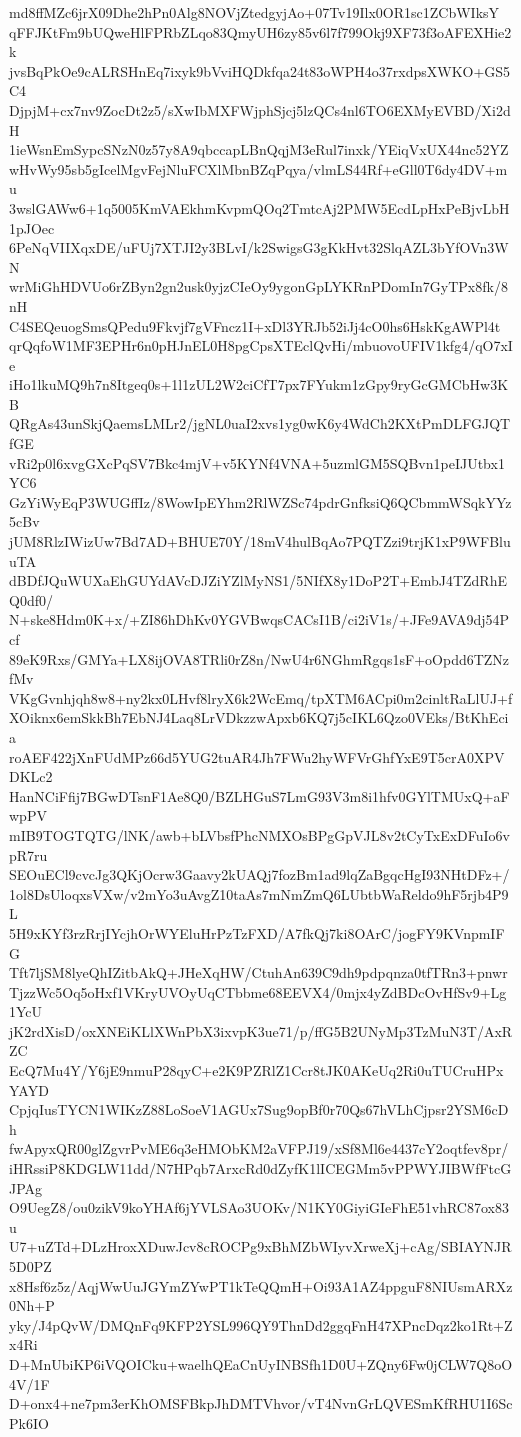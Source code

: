 md8ffMZc6jrX09Dhe2hPn0Alg8NOVjZtedgyjAo+07Tv19Ilx0OR1sc1ZCbWIksY
qFFJKtFm9bUQweHlFPRbZLqo83QmyUH6zy85v6l7f799Okj9XF73f3oAFEXHie2k
jvsBqPkOe9cALRSHnEq7ixyk9bVviHQDkfqa24t83oWPH4o37rxdpsXWKO+GS5C4
DjpjM+cx7nv9ZocDt2z5/sXwIbMXFWjphSjcj5lzQCs4nl6TO6EXMyEVBD/Xi2dH
1ieWsnEmSypcSNzN0z57y8A9qbccapLBnQqjM3eRul7inxk/YEiqVxUX44nc52YZ
wHvWy95sb5gIcelMgvFejNluFCXlMbnBZqPqya/vlmLS44Rf+eGll0T6dy4DV+mu
3wslGAWw6+1q5005KmVAEkhmKvpmQOq2TmtcAj2PMW5EcdLpHxPeBjvLbH1pJOec
6PeNqVIIXqxDE/uFUj7XTJI2y3BLvI/k2SwigsG3gKkHvt32SlqAZL3bYfOVn3WN
wrMiGhHDVUo6rZByn2gn2usk0yjzCIeOy9ygonGpLYKRnPDomIn7GyTPx8fk/8nH
C4SEQeuogSmsQPedu9Fkvjf7gVFncz1I+xDl3YRJb52iJj4cO0hs6HskKgAWPl4t
qrQqfoW1MF3EPHr6n0pHJnEL0H8pgCpsXTEclQvHi/mbuovoUFIV1kfg4/qO7xIe
iHo1lkuMQ9h7n8Itgeq0s+1l1zUL2W2ciCfT7px7FYukm1zGpy9ryGcGMCbHw3KB
QRgAs43unSkjQaemsLMLr2/jgNL0uaI2xvs1yg0wK6y4WdCh2KXtPmDLFGJQTfGE
vRi2p0l6xvgGXcPqSV7Bkc4mjV+v5KYNf4VNA+5uzmlGM5SQBvn1peIJUtbx1YC6
GzYiWyEqP3WUGffIz/8WowIpEYhm2RlWZSc74pdrGnfksiQ6QCbmmWSqkYYz5cBv
jUM8RlzIWizUw7Bd7AD+BHUE70Y/18mV4hulBqAo7PQTZzi9trjK1xP9WFBluuTA
dBDfJQuWUXaEhGUYdAVcDJZiYZlMyNS1/5NIfX8y1DoP2T+EmbJ4TZdRhEQ0df0/
N+ske8Hdm0K+x/+ZI86hDhKv0YGVBwqsCACsI1B/ci2iV1s/+JFe9AVA9dj54Pcf
89eK9Rxs/GMYa+LX8ijOVA8TRli0rZ8n/NwU4r6NGhmRgqs1sF+oOpdd6TZNzfMv
VKgGvnhjqh8w8+ny2kx0LHvf8lryX6k2WcEmq/tpXTM6ACpi0m2cinltRaLlUJ+f
XOiknx6emSkkBh7EbNJ4Laq8LrVDkzzwApxb6KQ7j5cIKL6Qzo0VEks/BtKhEcia
roAEF422jXnFUdMPz66d5YUG2tuAR4Jh7FWu2hyWFVrGhfYxE9T5crA0XPVDKLc2
HanNCiFfij7BGwDTsnF1Ae8Q0/BZLHGuS7LmG93V3m8i1hfv0GYlTMUxQ+aFwpPV
mIB9TOGTQTG/lNK/awb+bLVbsfPhcNMXOsBPgGpVJL8v2tCyTxExDFuIo6vpR7ru
SEOuECl9cvcJg3QKjOcrw3Gaavy2kUAQj7fozBm1ad9lqZaBgqcHgI93NHtDFz+/
1ol8DsUloqxsVXw/v2mYo3uAvgZ10taAs7mNmZmQ6LUbtbWaReldo9hF5rjb4P9L
5H9xKYf3rzRrjIYcjhOrWYEluHrPzTzFXD/A7fkQj7ki8OArC/jogFY9KVnpmIFG
Tft7ljSM8lyeQhIZitbAkQ+JHeXqHW/CtuhAn639C9dh9pdpqnza0tfTRn3+pnwr
TjzzWc5Oq5oHxf1VKryUVOyUqCTbbme68EEVX4/0mjx4yZdBDcOvHfSv9+Lg1YcU
jK2rdXisD/oxXNEiKLlXWnPbX3ixvpK3ue71/p/ffG5B2UNyMp3TzMuN3T/AxRZC
EcQ7Mu4Y/Y6jE9nmuP28qyC+e2K9PZRlZ1Ccr8tJK0AKeUq2Ri0uTUCruHPxYAYD
CpjqIusTYCN1WIKzZ88LoSoeV1AGUx7Sug9opBf0r70Qs67hVLhCjpsr2YSM6cDh
fwApyxQR00glZgvrPvME6q3eHMObKM2aVFPJ19/xSf8Ml6e4437cY2oqtfev8pr/
iHRssiP8KDGLW11dd/N7HPqb7ArxcRd0dZyfK1lICEGMm5vPPWYJIBWfFtcGJPAg
O9UegZ8/ou0zikV9koYHAf6jYVLSAo3UOKv/N1KY0GiyiGIeFhE51vhRC87ox83u
U7+uZTd+DLzHroxXDuwJcv8cROCPg9xBhMZbWIyvXrweXj+cAg/SBIAYNJR5D0PZ
x8Hsf6z5z/AqjWwUuJGYmZYwPT1kTeQQmH+Oi93A1AZ4ppguF8NIUsmARXz0Nh+P
yky/J4pQvW/DMQnFq9KFP2YSL996QY9ThnDd2ggqFnH47XPncDqz2ko1Rt+Zx4Ri
D+MnUbiKP6iVQOICku+waelhQEaCnUyINBSfh1D0U+ZQny6Fw0jCLW7Q8oO4V/1F
D+onx4+ne7pm3erKhOMSFBkpJhDMTVhvor/vT4NvnGrLQVESmKfRHU1I6ScPk6IO
